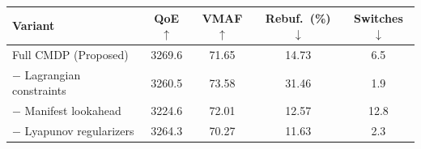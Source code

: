 \begin{tabular}{@{}lcccc@{}}
\toprule
\textbf{Variant} & \textbf{QoE}$\uparrow$ & \textbf{VMAF}$\uparrow$ & \textbf{Rebuf.\ (\%)}$\downarrow$ & \textbf{Switches}$\downarrow$ \\
\midrule
Full CMDP (Proposed)          & 3269.6 & 71.65 & 14.73 & 6.5 \\
$-$ Lagrangian constraints    & 3260.5 & 73.58 & 31.46 & 1.9 \\
$-$ Manifest lookahead        & 3224.6 & 72.01 & 12.57 & 12.8 \\
$-$ Lyapunov regularizers     & 3264.3 & 70.27 & 11.63 & 2.3 \\
\bottomrule
\end{tabular}